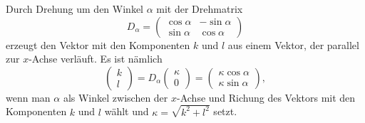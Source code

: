 Durch Drehung um den Winkel $\alpha$ mit der Drehmatrix
\[
D_\alpha
=
\begin{pmatrix*}
\cos\alpha&-\sin\alpha\\
\sin\alpha& \cos\alpha
\end{pmatrix*}
\]
erzeugt den Vektor mit den Komponenten $k$ und $l$ aus einem
Vektor, der parallel zur $x$-Achse verläuft.
Es ist nämlich
\[
\begin{pmatrix}k\\l\end{pmatrix}
=
D_\alpha
\begin{pmatrix}\kappa\\0\end{pmatrix}
=
\begin{pmatrix}
\kappa\cos\alpha\\
\kappa\sin\alpha
\end{pmatrix},
\]
wenn man $\alpha$ als Winkel zwischen der $x$-Achse und Richung
des Vektors mit den Komponenten $k$ und $l$ wählt und
$\kappa=\!\sqrt{k^2+l^2}$ setzt.

